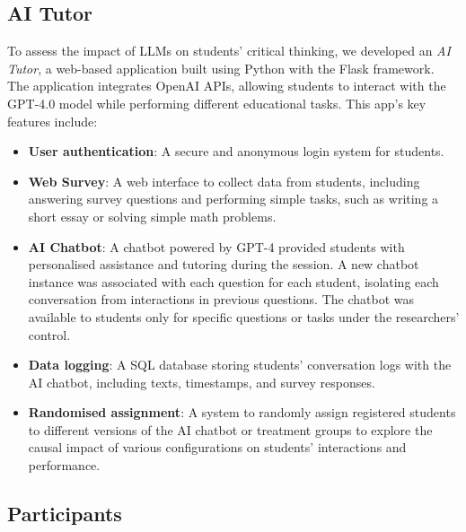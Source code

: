 \documentclass[
  11pt,
]{article}
\providecommand{\tightlist}{%
  \setlength{\itemsep}{0pt}\setlength{\parskip}{0pt}}
\begin{document}
\subsection{AI Tutor}\label{ai-tutor}

To assess the impact of LLMs on students' critical thinking, we developed an \emph{AI Tutor}, a web-based application built using Python with the Flask framework. The application integrates OpenAI APIs, allowing students to interact with the GPT-4.0 model while performing different educational tasks. This app's key features include:

\begin{itemize}
\tightlist
\item
  \textbf{User authentication}: A secure and anonymous login system for students.
\item
  \textbf{Web Survey}: A web interface to collect data from students, including answering survey questions and performing simple tasks, such as writing a short essay or solving simple math problems.
\item
  \textbf{AI Chatbot}: A chatbot powered by GPT-4 provided students with personalised assistance and tutoring during the session. A new chatbot instance was associated with each question for each student, isolating each conversation from interactions in previous questions. The chatbot was available to students only for specific questions or tasks under the researchers' control.
\item
  \textbf{Data logging}: A SQL database storing students' conversation logs with the AI chatbot, including texts, timestamps, and survey responses.
\item
  \textbf{Randomised assignment}: A system to randomly assign registered students to different versions of the AI chatbot or treatment groups to explore the causal impact of various configurations on students' interactions and performance.
\end{itemize}

\subsection{Participants}\label{participants}
\end{document}
